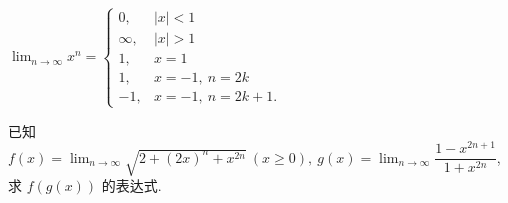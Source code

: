 \begin{theorem}\label{theorem:xn011-1}
    $\displaystyle\lim_{n \to \infty } x^n=\begin{cases}
            0,      & |x|<1         \\
            \infty, & |x|>1         \\
            1,      & x=1           \\
            1,      & x=-1,~n=2k    \\
            -1,     & x=-1,~n=2k+1.
        \end{cases}$
\end{theorem}

\begin{example}
    已知 $f(x)=\displaystyle\lim_{n\to\infty}\sqrt{2+(2x)^n+x^{2n}}~(x\geqslant 0),~g(x)=\lim_{n\to\infty}\dfrac{1-x^{2n+1}}{1+x^{2n}}$, 求 $f(g(x))$ 的表达式.
\end{example}
